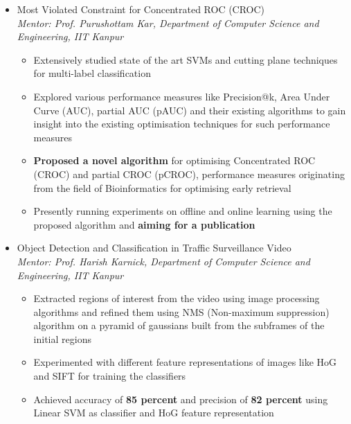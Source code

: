 \documentclass{article}
\begin{document}
\begin{itemize}[leftmargin=0.07cm]
\item[] {\large Most Violated Constraint for Concentrated ROC (CROC)}\hspace*{\fill}\\
\emph{Mentor: Prof. Purushottam Kar, Department of Computer Science and Engineering, IIT Kanpur
}	\begin{itemize}
	\item Extensively studied state of the art SVMs and cutting plane techniques for multi-label classification
	\item Explored various performance measures like Precision@k, Area Under Curve (AUC), partial AUC (pAUC) and their existing algorithms to gain insight into the existing optimisation techniques for such performance measures
	\item \textbf{Proposed a novel algorithm} for optimising Concentrated ROC (CROC) and partial CROC (pCROC), performance measures originating from the field of Bioinformatics for optimising early retrieval
	\item Presently running experiments on offline and online learning using the proposed algorithm and \textbf{aiming for a publication}
	\end{itemize}

\item[] {\large Object Detection and Classification in Traffic Surveillance Video}\hspace*{\fill}\\
\emph{Mentor: Prof. Harish Karnick, Department of Computer Science and Engineering, IIT Kanpur
}	\begin{itemize}
	\item Extracted regions of interest from the video using image processing algorithms and refined them using NMS
(Non-maximum suppression) algorithm on a pyramid of gaussians built from the subframes of the initial regions
	\item Experimented with different feature representations of images like HoG and SIFT for training the classifiers
	\item Achieved accuracy of \textbf{85 percent} and precision of \textbf{82 percent} using Linear SVM as classifier and HoG feature representation
	\end{itemize}


\end{itemize}
\end{document}
